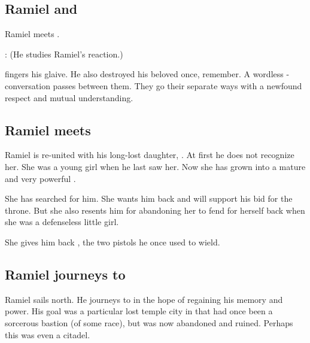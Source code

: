 \subsection{Ramiel and \Ishnaruchaefir}
Ramiel meets \Ishnaruchaefir. 

\begin{prose}
  \Ishnaruchaefir:
  (He studies Ramiel's reaction.)
  
  \Ishnaruchaefir{} fingers his glaive.
  He also destroyed his beloved once, remember. 
  A wordless -conversation passes between them. 
  They go their separate ways with a newfound respect and mutual understanding. 
\end{prose}









\subsection{Ramiel meets \Cishiel}
Ramiel is re-united with his long-lost daughter, . 
At first he does not recognize her. 
She was a young girl when he last saw her.
Now she has grown into a mature and very powerful \resvil. 

She has searched for him. 
She wants him back and will support his bid for the throne. 
But she also resents him for abandoning her to fend for herself back when she was a defenseless little girl. 

She gives him back , the two pistols he once used to wield. 









\subsection{Ramiel journeys to \UltimaThule}
Ramiel sails north. 
He journeys to  in the hope of regaining his memory and power. 
His goal was a particular lost temple city in \UltimaThule that had once been a sorcerous bastion (of some race), but was now abandoned and ruined.
Perhaps this was even a \voyager citadel.

